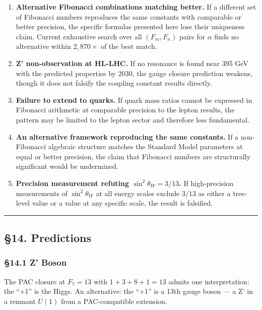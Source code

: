 \documentclass[
  11pt,
  a4paper]{article}
\begin{document}
\begin{enumerate}
\def\labelenumi{\arabic{enumi}.}
\item
  \textbf{Alternative Fibonacci combinations matching better.} If a
  different set of Fibonacci numbers reproduces the same constants with
  comparable or better precision, the specific formulas presented here
  lose their uniqueness claim. Current exhaustive search over all
  \((F_m, F_n)\) pairs for \(\alpha\) finds no alternative within
  \(2{,}870\times\) of the best match.
\item
  \textbf{Z' non-observation at HL-LHC.} If no resonance is found near
  395 GeV with the predicted properties by 2030, the gauge closure
  prediction weakens, though it does not falsify the coupling constant
  results directly.
\item
  \textbf{Failure to extend to quarks.} If quark mass ratios cannot be
  expressed in Fibonacci arithmetic at comparable precision to the
  lepton results, the pattern may be limited to the lepton sector and
  therefore less fundamental.
\item
  \textbf{An alternative framework reproducing the same constants.} If a
  non-Fibonacci algebraic structure matches the Standard Model
  parameters at equal or better precision, the claim that Fibonacci
  numbers are structurally significant would be undermined.
\item
  \textbf{Precision measurement refuting \(\sin^2\theta_W = 3/13\).} If
  high-precision measurements of \(\sin^2\theta_W\) at all energy scales
  exclude \(3/13\) as either a tree-level value or a value at any
  specific scale, the result is falsified.
\end{enumerate}

\begin{center}\rule{0.5\linewidth}{0.5pt}\end{center}

\subsection{§14. Predictions}\label{predictions}

\subsubsection{§14.1 Z' Boson}\label{z-boson}

The PAC closure at \(F_7 = 13\) with \(1 + 3 + 8 + 1 = 13\) admits one
interpretation: the ``+1'' is the Higgs. An alternative: the ``+1'' is a
13th gauge boson --- a Z' in a remnant \(U(1)\) from a PAC-compatible
extension.
\end{document}
